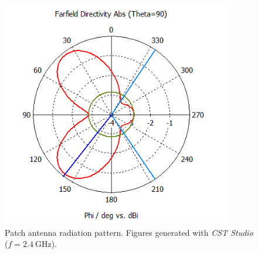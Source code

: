 \begin{figure}[H]
\begin{minipage}{0.45\textwidth}
        \includegraphics[width=0.9\textwidth]{figures/farfield (f=2.4) patch_1.png} %
    \end{minipage}
    \caption{Patch antenna radiation pattern. Figures generated with \textit{CST Studio} ($f=\SI{2.4}{\giga\hertz}$).}
    \label{fig:patch_1}
\end{figure}

